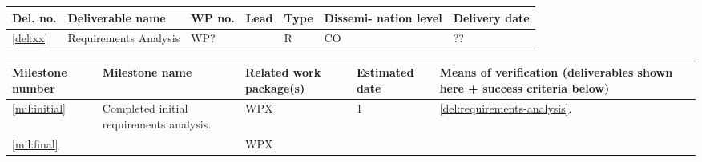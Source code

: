 \documentclass[a4paper,11pt]{article}
\begin{document}

\newpage


\label{sect:deliverables}

\bigskip\bigskip\bigskip

\begin{minipage}{\textwidth}
\begin{center}
\begin{tabular}{|p{0.8cm}|p{8.75cm}|p{0.8cm}|p{1.2cm}|p{1.2cm}|p{1.2cm}|p{1.2cm}|}  \hline
\textbf{Del. no.}              & \textbf{Deliverable name}        & \textbf{WP no.} & \textbf{Lead}
& \textbf{Type}              & \textbf{Dissemi- nation level}   & \textbf{Delivery date}
\\ \hline


\ref{del:xx}  & Requirements Analysis                            
& WP? & & R & CO &  ?? \\
\hline
\end{tabular}
\end{center}
\end{minipage}


\newpage



\label{sect:milestones}

\bigskip\bigskip\bigskip

\begin{minipage}{\textwidth}
\begin{center}
\begin{tabular*}{\textwidth}{|p{1.5cm}|p{6.7cm}|p{2.5cm}|p{1.5cm}|p{3.6cm}|}  \hline
\textbf{Milestone number} & \textbf{Milestone name} & \textbf{Related work
  package(s)} & \textbf{Estimated date} & \textbf{Means of
  verification} (deliverables shown here + success criteria below) \\
\hline
\ref{mil:initial} &
  Completed initial requirements analysis.  &
  WPX &
  1 &
\ref{del:requirements-analysis}.
\\
\ref{mil:final} &
&
WPX &
&
\\
\hline
\end{tabular*}
\end{center}
\end{minipage}
\end{document}
